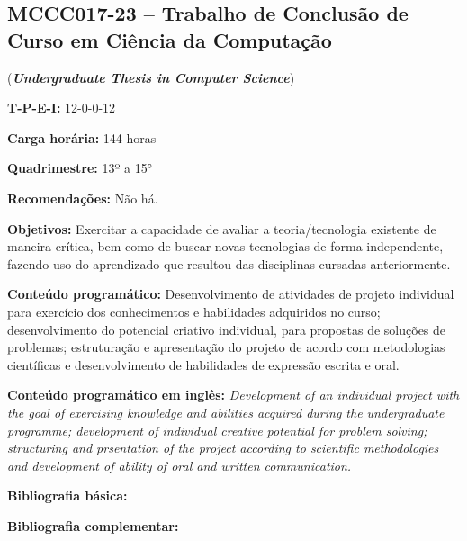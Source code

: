 \documentclass[12pt,a4paper]{article}
\begin{document}
\subsection*{MCCC017-23 -- Trabalho de Conclusão de Curso em Ciência da Computação}
\label{disc:tcc}

(\textbf{\textit{Undergraduate Thesis in Computer Science}})

\begin{center}
\begin{minipage}{0.85\textwidth}

    \textbf{T-P-E-I:} 12-0-0-12

    \textbf{Carga horária:} 144 horas
    
    \textbf{Quadrimestre:} 13º a 15°
    
    \textbf{Recomendações:} Não há.
    
\end{minipage}
\end{center}

\textbf{Objetivos:}
Exercitar a capacidade de avaliar a teoria/tecnologia existente de
maneira crítica, bem como de buscar novas tecnologias de forma
independente, fazendo uso do aprendizado que resultou das disciplinas
cursadas anteriormente.

\textbf{Conteúdo programático:}
Desenvolvimento de atividades de projeto individual para exercício dos
conhecimentos e habilidades adquiridos no curso; desenvolvimento do
potencial criativo individual, para propostas de soluções de
problemas; estruturação e apresentação do projeto de acordo com
metodologias científicas e desenvolvimento de habilidades de expressão
escrita e oral.


\textbf{Conteúdo programático em inglês:}
\textit{Development of an individual project with the goal of exercising
  knowledge and abilities acquired during the undergraduate programme;
  development of individual creative potential for problem solving;
  structuring and prsentation of the project according to scientific
  methodologies and development of ability of oral and written communication.}
  
\newrefsection
\textbf{Bibliografia básica:}
\nocite{2007-cervo-bervian, 2010-creswell-creswell, 2010-salomon} 
\printbibliography

\newrefsection
\textbf{Bibliografia complementar:}
\nocite{2015-junior, 2014-wazlawick, 2019-medeiros, 2016-wayne, 2001-rubens}

\printbibliography
\end{document}
